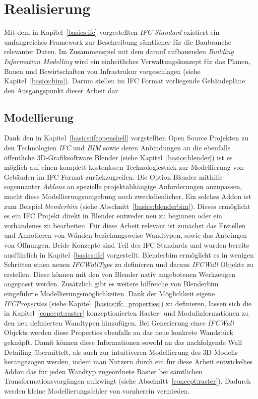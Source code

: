 \chapter{Realisierung}
Mit dem in Kapitel~\ref{basics:ifc} vorgestellten \textit{IFC Standard} existiert ein umfangreiches Framework zur Beschreibung sämtlicher für die Baubranche relevanter Daten. 
Im Zusammenspiel mit dem darauf aufbauenden \textit{Building Information Modelling} wird ein einheitliches Verwaltungskonzept für das Planen, Bauen und Bewirtschaften von Infrastrukur vorgeschlagen (siehe Kapitel~\ref{basics:bim}).
Darum stellen im IFC Format vorliegende Gebäudepläne den Ausgangspunkt dieser Arbeit dar.

\section{Modellierung}\label{real:modellierung}
Dank den in Kapitel~\ref{basics:ifcopenshell} vorgstellten Open Source Projekten zu den Technologien \textit{IFC} und \textit{BIM} sowie deren Anbindungen an die ebenfalls öffentliche 3D-Grafiksoftware Blender (siehe Kapitel~\ref{basics:blender}) ist es möglich auf einen komplett kostenlosen Technologiestack zur Modellierung von Gebäuden im IFC Format zurückzugreifen.
Die Option Blender mithilfe sogennanter \textit{Addons} an spezielle projektabhängige Anforderungen anzupassen, macht diese Modellierungsumgebung noch zweckdienlicher.
Ein solches Addon ist zum Beispiel \textit{blenderbim} (siehe Abschnitt~\ref{basics:blenderbim}). 
Dieses ermöglicht es ein IFC Projekt direkt in Blender entweder neu zu beginnen oder ein vorhandenes zu bearbeiten.
Für diese Arbeit relevant ist zunächst das Erstellen und Annotieren von Wänden beziehungsweise Wandtypen, sowie das Anbringen von Öffnungen.
Beide Konzepte sind Teil des IFC Standards und wurden bereits ausführlich in Kapitel~\ref{basics:ifc} vorgestellt.
Blenderbim ermöglicht es in wenigen Schritten einen neuen \textit{IFCWallType} zu definieren und daraus \textit{IFCWall} Objekte zu erstellen.
Diese können mit den von Blender nativ angebotenen Werkzeugen angepasst werden.
Zusätzlich gibt es weitere hilfreiche von Blenderbim eingeführte Modellierungsmöglichkeiten.
Dank der Möglichkeit eigene \textit{IFCProperties} (siehe Kapitel~\ref{basics:ifc_properties}) zu definieren, lassen sich die in Kapitel~\ref{concept:raster} konzeptionierten Raster- und Modulinformationen zu den neu definierten Wandtypen hinzufügen.
Bei Generierung eines \textit{IFCWall} Objekts werden diese Properties ebenfalls an das neue konkrete Wandstück geknüpft.
Damit können diese Informationen sowohl an das nachfolgende Wall Detailing übermittelt, als auch zur intuitiveren Modellierung des 3D Modells herangezogen werden, indem man Nutzern durch ein für diese Arbeit entwickeltes Addon das für jeden Wandtyp zugeordnete Raster bei sämtlichen Transformationsvorgängen aufzwingt (siehe Abschnitt~\ref{concept:raster}).
Dadurch werden kleine Modellierungsfehler von vornherein vermieden.

